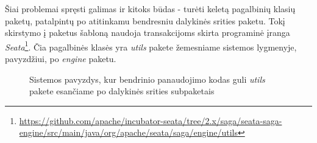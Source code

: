 Šiai problemai spręsti galimas ir kitoks būdas - turėti keletą pagalbinių klasių paketų, patalpintų po atitinkamu bendresniu dalykinės srities
 paketu.
Tokį skirstymo į paketus šabloną naudoja transakcijoms skirta programinė įranga \textit{Seata}\footnote{\url{https://github.com/apache/incubator-seata/tree/2.x/saga/seata-saga-engine/src/main/java/org/apache/seata/saga/engine/utils}}.
Čia pagalbinės klasės yra \textit{utils} pakete žemesniame sistemos lygmenyje, pavyzdžiui, po \textit{engine} paketu.
\begin{figure}[H]
    \snugshade
    \endsnugshade
    \caption{Sistemos pavyzdys, kur bendrinio panaudojimo kodas guli \textit{utils} pakete esančiame po dalykinės srities subpaketais}
\end{figure}

